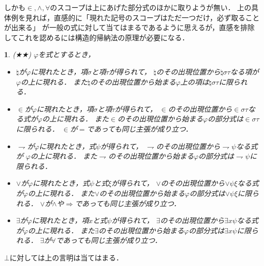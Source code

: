 \documentclass[a4j,10.5pt,oneside,openany]{jsbook}
\theoremstyle{mystyle}
\newtheorem{metathm}[thm]{\color{DarkMidnightBlue}{メタ定理}}
\begin{document}
	しかも$\in,\wedge,\forall$のスコープは上にあげた部分式のほかに取りようが無い．
	上の具体例を見れば，直感的に「現れた記号のスコープはただ一つだけ，必ず取ることが出来る」
	が一般の式に対して当てはまるであるように思えるが，直感を排除してこれを認めるには構造的帰納法の原理が必要になる．
	
	\begin{screen}
		\begin{metathm}
		(★★) $\varphi$を式とするとき，
		\begin{itemize}
			\item $\natural$が$\varphi$に現れたとき，項$\sigma$と項$\tau$が得られて，
				$\natural$のその出現位置から$\natural \sigma \tau$なる項が$\varphi$の上に現れる．
				また$\natural$のその出現位置から始まる$\varphi$上の項は$\natural \sigma \tau$に限られる．
				
			\item $\in$が$\varphi$に現れたとき，項$\sigma$と項$\tau$が得られて，
				$\in$のその出現位置から$\in \sigma \tau$なる式が$\varphi$の上に現れる．
				また$\in$のその出現位置から始まる$\varphi$の部分式は$\in \sigma \tau$に限られる．
				$\in$が$=$であっても同じ主張が成り立つ．
				
			\item $\rightharpoondown$が$\varphi$に現れたとき，式$\psi$が得られて，
				$\rightharpoondown$のその出現位置から$\rightharpoondown \psi$なる式が
				$\varphi$の上に現れる．
				また$\rightharpoondown$のその出現位置から始まる$\varphi$の部分式は$\rightharpoondown \psi$に限られる．
				
			\item $\vee$が$\varphi$に現れたとき，式$\psi$と式$\xi$が得られて，
				$\vee$のその出現位置から$\vee \psi \xi$なる式が$\varphi$の上に現れる．
				また$\vee$のその出現位置から始まる$\varphi$の部分式は$\vee \psi \xi$に限られる．
				$\vee$が$\wedge$や$\Longrightarrow$であっても同じ主張が成り立つ．
				
			\item $\exists$が$\varphi$に現れたとき，項$x$と式$\psi$が得られて，
				$\exists$のその出現位置から$\exists x \psi$なる式が$\varphi$の上に現れる．
				また$\exists$のその出現位置から始まる$\varphi$の部分式は$\exists x \psi$に限られる．
				$\exists$が$\forall$であっても同じ主張が成り立つ．
		\end{itemize}
		\end{metathm}
	\end{screen}
	
	$\bot$に対しては上の言明は当てはまる．
	
\end{document}
